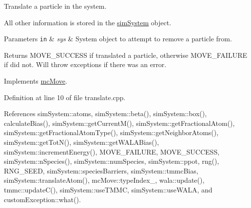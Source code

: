 Translate a particle in the system. 

All other information is stored in the \hyperlink{classsim_system}{sim\-System} object.


\begin{DoxyParams}[1]{Parameters}
\mbox{\tt in}  & {\em sys} & System object to attempt to remove a particle from.\\
\hline
\end{DoxyParams}
\begin{DoxyReturn}{Returns}
M\-O\-V\-E\-\_\-\-S\-U\-C\-C\-E\-S\-S if translated a particle, otherwise M\-O\-V\-E\-\_\-\-F\-A\-I\-L\-U\-R\-E if did not. Will throw exceptions if there was an error. 
\end{DoxyReturn}


Implements \hyperlink{classmc_move_a2e377a628f9ecee5422fc8967d4924eb}{mc\-Move}.



Definition at line 10 of file translate.\-cpp.



References sim\-System\-::atoms, sim\-System\-::beta(), sim\-System\-::box(), calculate\-Bias(), sim\-System\-::get\-Current\-M(), sim\-System\-::get\-Fractional\-Atom(), sim\-System\-::get\-Fractional\-Atom\-Type(), sim\-System\-::get\-Neighbor\-Atoms(), sim\-System\-::get\-Tot\-N(), sim\-System\-::get\-W\-A\-L\-A\-Bias(), sim\-System\-::increment\-Energy(), M\-O\-V\-E\-\_\-\-F\-A\-I\-L\-U\-R\-E, M\-O\-V\-E\-\_\-\-S\-U\-C\-C\-E\-S\-S, sim\-System\-::n\-Species(), sim\-System\-::num\-Species, sim\-System\-::ppot, rng(), R\-N\-G\-\_\-\-S\-E\-E\-D, sim\-System\-::species\-Barriers, sim\-System\-::tmmc\-Bias, sim\-System\-::translate\-Atom(), mc\-Move\-::type\-Index\-\_\-, wala\-::update(), tmmc\-::update\-C(), sim\-System\-::use\-T\-M\-M\-C, sim\-System\-::use\-W\-A\-L\-A, and custom\-Exception\-::what().



